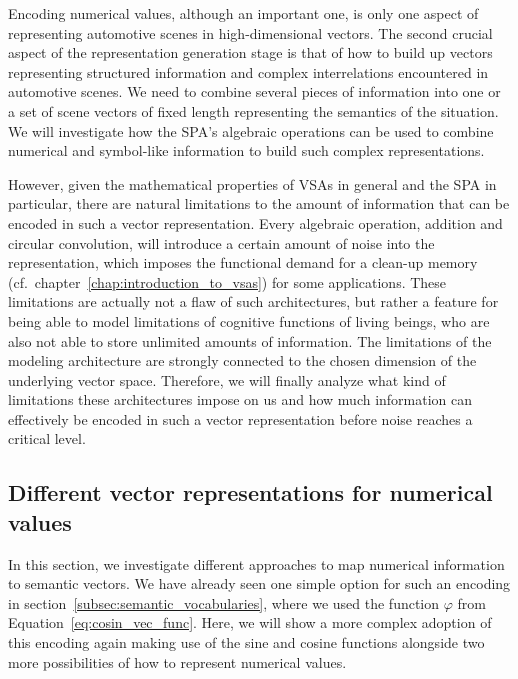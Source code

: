 Encoding numerical values, although an important one, is only one aspect of representing automotive scenes in high-dimensional vectors.
The second crucial aspect of the representation generation stage is that of how to build up vectors representing structured information and complex interrelations encountered in automotive scenes.
We need to combine several pieces of information into one or a set of scene vectors of fixed length representing the semantics of the situation.
We will investigate how the \ac{SPA}'s algebraic operations can be used to combine numerical and symbol-like information to build such complex representations.

However, given the mathematical properties of \acp{VSA} in general and the \ac{SPA} in particular, there are natural limitations to the amount of information that can be encoded in such a vector representation.
Every algebraic operation, addition and circular convolution, will introduce a certain amount of noise into the representation, which imposes the functional demand for a clean-up memory (cf.\ chapter~\ref{chap:introduction_to_vsas}) for some applications.
These limitations are actually not a flaw of such architectures, but rather a feature for being able to model limitations of cognitive functions of living beings, who are also not able to store unlimited amounts of information.
The limitations of the modeling architecture are strongly connected to the chosen dimension of the underlying vector space.
Therefore, we will finally analyze what kind of limitations these architectures impose on us and how much information can effectively be encoded in such a vector representation before noise reaches a critical level.

\subsection{Different vector representations for numerical values}%
\label{subsec:different_vector_representations_for_numerical_values}

In this section, we investigate different approaches to map numerical information to semantic vectors.
We have already seen one simple option for such an encoding in section~\ref{subsec:semantic_vocabularies}, where we used the function $\varphi$ from Equation~\eqref{eq:cosin_vec_func}.
Here, we will show a more complex adoption of this encoding again making use of the sine and cosine functions alongside two more possibilities of how to represent numerical values.

